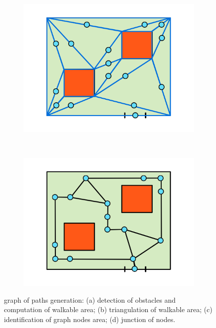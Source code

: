 \begin{figure}[!htbp]
\begin{subfigure}[b]{0.235\textwidth}
 \includegraphics[width=\textwidth]{images/graph-generation/single/graph-generation-3}
 \caption{}
 \label{fig:graph-generation-c}
 \end{subfigure}
 ~
 \begin{subfigure}[b]{0.235\textwidth}
 \includegraphics[width=\textwidth]{images/graph-generation/single/graph-generation-4}
 \caption{}
 \label{fig:graph-generation-d}
 \end{subfigure}
 
 \caption{graph of paths generation: 
 (a) detection of obstacles and computation of walkable area; 
 (b) triangulation of walkable area; 
 (c) identification of graph nodes area; 
 (d) junction of nodes.
 }
 \label{fig:graph-generation}
\end{figure}

